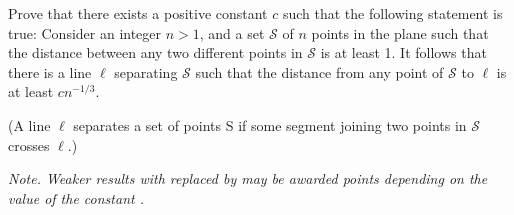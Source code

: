 Prove that there exists a positive constant $c$ such that the following statement is true:
Consider an integer $n > 1$, and a set $\mathcal S$ of $n$ points in the plane such that the distance between any two different points in $\mathcal S$ is at least 1. It follows that there is a line $\ell$ separating $\mathcal S$ such that the distance from any point of $\mathcal S$ to $\ell$ is at least $cn^{-1/3}$.

(A line $\ell$ separates a set of points S if some segment joining two points in $\mathcal S$ crosses $\ell$.)

\textit{Note. Weaker results with  replaced by  may be awarded points depending on the value of the constant .}

